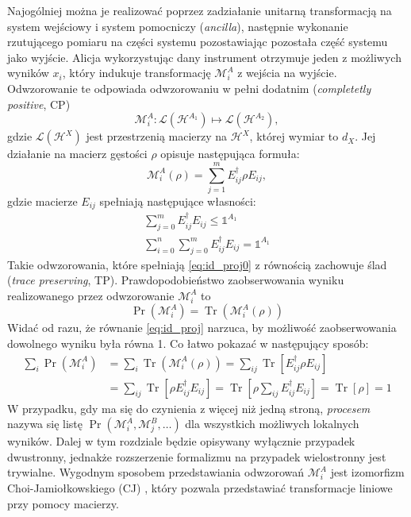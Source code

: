 \documentclass[10pt]{article} %
\DeclareMathOperator{\Trs}{Tr}
\newcommand{\Mats}[1]{\mathcal{L}(#1)}
\newcommand{\Hx}[1]{\mathcal{H}^{#1}}
\newcommand{\LHx}[1]{\Mats{\Hx{#1}}}
\newcommand{\MXi}[3]{\mathcal{M}^{#1}_{#2}(#3)}
\newcommand{\MXin}[2]{\mathcal{M}^{#1}_{#2}}
\newcommand{\MAin}[0]{\MXin{A}{i}}
\newcommand{\MAi}[1]{\MXi{A}{i}{#1}}
\newcommand{\MAir}{\MAi{\rho}}
\newcommand{\Idx}[1]{\mathbb{1}^{#1}}
\newcommand{\Tr}[1]{\Trs(#1)}
\newcommand{\Pro}[1]{\Pr(#1)}
\begin{document}
Najogólniej można je realizować poprzez zadziałanie unitarną transformacją na system wejściowy i system pomocniczy (\textit{ancilla}), następnie wykonanie rzutującego pomiaru na części systemu pozostawiając pozostała część systemu jako wyjście. Alicja wykorzystując dany instrument otrzymuje jeden z możliwych wyników $x_i$, który indukuje transformację $\mathcal{M}^A_i$ z wejścia na wyjście. Odwzorowanie te odpowiada odwzorowaniu w pełni dodatnim (\textit{completetly positive}, CP)
\begin{equation}
\mathcal{M}^A_i : \mathcal{L}(\mathcal{H}^{A_1}) \mapsto \mathcal{L}(\mathcal{H}^{A_2}),
\end{equation}
gdzie $\LHx{X}$ jest przestrzenią macierzy na $\Hx{X}$, której wymiar to $d_X$. Jej działanie na macierz gęstości $\rho$ opisuje następująca formuła:
\begin{equation}
\label{yolo}
\MAi{\rho} = \sum^m_{j=1} E_{ij} ^\dag \rho E_{ij},
\end{equation}
gdzie macierze $E_{ij}$ spełniają następujące własności:
\begin{gather}
\label{eq:id_proj0} 
\sum^m_{j=0} E_{ij}^\dag E_{ij} \leq \Idx{A_1} \\
\label{eq:id_proj} 
\sum^n_{i=0} \sum^m_{j=0} E_{ij}^\dag E_{ij} = \Idx{A_1}
\end{gather}
Takie odwzorowania, które spełniają \eqref{eq:id_proj0} z równością zachowuje ślad (\textit{trace preserving}, TP).
Prawdopodobieństwo zaobserwowania wyniku realizowanego przez odwzorowanie $\MAin$ to
\begin{equation}
\label{eq:probqi}
\Pro{\MAin} = \Tr{\MAir}
\end{equation}
Widać od razu, że równanie \eqref{eq:id_proj} narzuca, by możliwość zaobserwowania dowolnego wyniku była równa 1. Co łatwo pokazać w następujący sposób:
\begin{equation}
\begin{split}
\sum_i \Pro{\MAin} &= \sum_i \Tr{\MAir} = \sum_{ij} \Trs \left[E^\dag_{ij}\rho E_{ij}\right]\\ &= \sum_{ij} \Trs\left[ \rho E^\dag_{ij}E_{ij}\right] = \Trs \left[ \rho \sum_{ij}  E^\dag_{ij}E_{ij}\right] = \Trs \left[ \rho \right] = 1
\end{split}
\end{equation}
W przypadku, gdy ma się do czynienia z więcej niż jedną stroną, \textit{procesem} nazywa się listę $\Pr(\MXin{A}{i}, \MXin{B}{j}, \dots)$ dla wszystkich możliwych lokalnych wyników. Dalej w tym rozdziale będzie opisywany wyłącznie przypadek dwustronny, jednakże rozszerzenie formalizmu na przypadek wielostronny jest trywialne. Wygodnym sposobem przedstawiania odwzorowań $\MAin$ jest izomorfizm Choi-Jamiołkowskiego (CJ) \cite{cj_iso1, cj_iso2}, który pozwala przedstawiać transformacje liniowe przy pomocy macierzy. 
\end{document}
